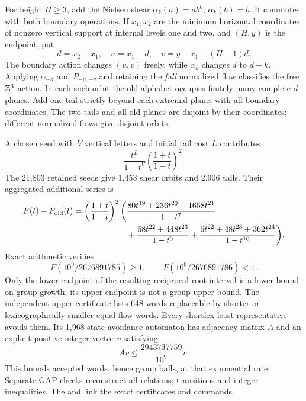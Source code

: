 For height $H\ge3$, add the Nielsen shear
$\alpha_k(a)=ab^k$, $\alpha_k(b)=b$. It commutes with both boundary
operations. If $x_1,x_2$ are the minimum horizontal coordinates of
nonzero vertical support at internal levels one and two, and $(H,y)$
is the endpoint, put
\[
 d=x_2-x_1,\quad u=x_1-d,\quad v=y-x_1-(H-1)d.
\]
The boundary action changes $(u,v)$ freely, while $\alpha_k$ changes
$d$ to $d+k$. Applying $\alpha_{-d}$ and $P_{-u,-v}$ and retaining
the \emph{full} normalized flow classifies the free $\mathbb Z^3$ action.
In each such orbit the old alphabet occupies finitely many complete
$d$-planes. Add one tail strictly beyond each extremal plane, with
all boundary coordinates. The two tails and all old planes are
disjoint by their coordinates; different normalized flows give
disjoint orbits.

A chosen seed with $V$ vertical letters and initial tail cost $L$
contributes
\[
 \frac{t^L}{1-t^V}\left(\frac{1+t}{1-t}\right)^2.
\]
The 21,803 retained seeds give 1,453 shear orbits and 2,906 tails.
Their aggregated additional series is
\begin{align*}
 F(t)-F_{\rm old}(t)=\left(\frac{1+t}{1-t}\right)^2
 \bigg(&\frac{80t^{19}+236t^{20}+1658t^{21}}{1-t^7}\\
 &+\frac{68t^{22}+448t^{23}}{1-t^9}
 +\frac{6t^{22}+48t^{23}+362t^{24}}{1-t^{10}}\bigg).
\end{align*}
Exact arithmetic verifies
\[
 F(10^9/2676891785)\ge1,\qquad
 F(10^9/2676891786)<1.
\]
Only the lower endpoint of the resulting reciprocal-root interval is
a lower bound on group growth; its upper endpoint is not a group
upper bound. The independent upper certificate lists 648 words
replaceable by shorter or lexicographically smaller equal-flow words.
Every shortlex least representative avoids them. Its 1,968-state
avoidance automaton has adjacency matrix $A$ and an explicit positive
integer vector $v$ satisfying
\[
 Av\le \frac{2943737759}{10^9}v.
\]
This bounds accepted words, hence group balls, at that exponential rate.
Separate GAP checks reconstruct all relations, transitions and integer
inequalities. The
and 
link the exact certificates and commands.

